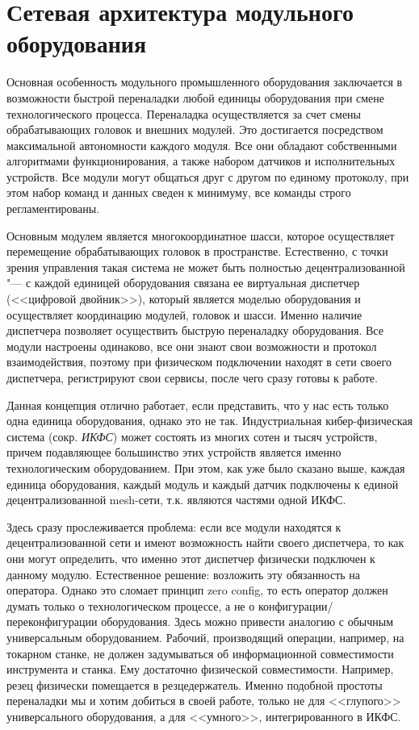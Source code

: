 \section{Сетевая архитектура модульного оборудования}\label{sec:ch3/sec2}

Основная особенность модульного промышленного оборудования заключается в возможности быстрой переналадки любой единицы оборудования при смене технологического процесса. Переналадка осуществляется за счет смены обрабатывающих головок и внешних модулей.  Это достигается посредством максимальной автономности каждого модуля. Все они обладают собственными алгоритмами функционирования, а также набором датчиков и исполнительных устройств. Все модули могут общаться друг с другом по единому протоколу, при этом набор команд и данных сведен к минимуму, все команды строго регламентированы.

Основным модулем является многокоординатное шасси, которое осуществляет перемещение обрабатывающих головок в пространстве. Естественно, с точки зрения управления такая система не может быть полностью децентрализованной "--- с каждой единицей оборудования связана ее виртуальная диспетчер (<<цифровой двойник>>), который является моделью оборудования и осуществляет координацию модулей, головок и шасси. Именно наличие диспетчера позволяет осуществить быструю переналадку оборудования. Все модули настроены одинаково, все они знают свои возможности и протокол взаимодействия, поэтому при физическом подключении находят в сети своего диспетчера, регистрируют свои сервисы, после чего сразу готовы к работе.

Данная концепция отлично работает, если представить, что у нас есть только одна единица оборудования, однако это не так. Индустриальная кибер-физическая система (сокр. \textit{ИКФС}) может состоять из многих сотен и тысяч устройств, причем подавляющее большинство этих устройств является именно технологическим оборудованием. При этом, как уже было сказано выше, каждая единица оборудования, каждый модуль и каждый датчик подключены к единой децентрализованной mesh-сети, т.\:к. являются частями одной ИКФС.

Здесь сразу прослеживается проблема: если все модули находятся к децентрализованной сети и имеют возможность найти своего диспетчера, то как они могут определить, что именно этот диспетчер физически подключен к данному модулю. Естественное решение: возложить эту обязанность на оператора. Однако это сломает принцип zero config, то есть оператор должен думать только о технологическом процессе, а не о конфигурации/переконфигурации оборудования. Здесь можно привести аналогию с обычным универсальным оборудованием. Рабочий, производящий операции, например, на токарном станке, не должен задумываться об информационной совместимости инструмента и станка. Ему достаточно физической совместимости. Например, резец физически помещается в резцедержатель. Именно подобной простоты переналадки мы и хотим добиться в своей работе, только не для <<глупого>> универсального оборудования, а для <<умного>>, интегрированного в ИКФС.

